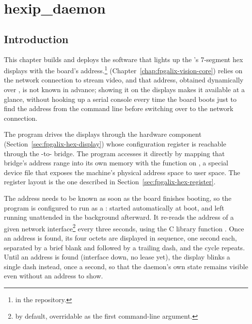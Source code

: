 \chapter{hexip\_daemon}
\label{chap:fpgalix-hexip-daemon}

\section{Introduction}

This chapter builds and deploys the software that lights up the 's 7-segment hex displays with the board's  address.\footnote{ in the repository.}  (Chapter~\ref{chap:fpgalix-vision-core}) relies on the network connection to stream video, and that address, obtained dynamically over , is not known in advance; showing it on the displays makes it available at a glance, without hooking up a serial console every time the board boots just to find the address from the command line before switching over to the network connection.

The program drives the displays through the  hardware component (Section~\ref{sec:fpgalix-hex-display}) whose configuration register is reachable through the -to- bridge. The program accesses it directly by mapping that bridge's address range into its own memory with the  function on , a special  device file that exposes the machine's physical address space to user space. The register layout is the one described in Section~\ref{sec:fpgalix-hex-register}.

The  address needs to be known as soon as the board finishes booting, so the program is configured to run as a : started automatically at boot, and left running unattended in the background afterward. It re-reads the address of a given network interface\footnote{ by default, overridable as the first command-line argument.} every three seconds, using the C library function . Once an  address is found, its four octets are displayed in sequence, one second each, separated by a brief blank and followed by a trailing dash, and the cycle repeats. Until an  address is found (interface down, no  lease yet), the display blinks a single dash instead, once a second, so that the daemon's own state remains visible even without an address to show.

